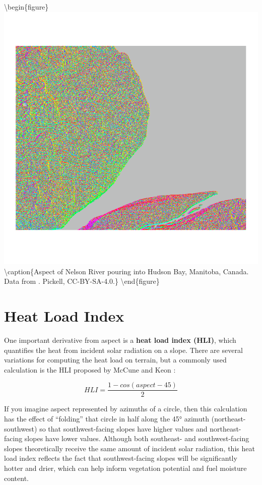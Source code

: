 \documentclass[
]{book}
\begin{document}
\textbackslash begin\{figure\}
\includegraphics[width=0.75\linewidth]{images/09-nelson-river-aspect} \textbackslash caption\{Aspect of Nelson River pouring into Hudson Bay, Manitoba, Canada. Data from \citet{earth_resources_observation_and_science_center_usgs_2018}. Pickell, CC-BY-SA-4.0.\}\label{fig:9-nelson-river-aspect}
\textbackslash end\{figure\}

\hypertarget{heat-load-index}{%
\section{Heat Load Index}\label{heat-load-index}}

One important derivative from aspect is a \textbf{heat load index (HLI)}, which quantifies the heat from incident solar radiation on a slope. There are several variations for computing the heat load on terrain, but a commonly used calculation is the HLI proposed by McCune and Keon \citep{mccune_equations_2002}:

\[
HLI=\frac{1-cos(aspect-45)}{2}
\]

If you imagine aspect represented by azimuths of a circle, then this calculation has the effect of ``folding'' that circle in half along the 45° azimuth (northeast-southwest) so that southwest-facing slopes have higher values and northeast-facing slopes have lower values. Although both southeast- and southwest-facing slopes theoretically receive the same amount of incident solar radiation, this heat load index reflects the fact that southwest-facing slopes will be significantly hotter and drier, which can help inform vegetation potential and fuel moisture content.
\end{document}
